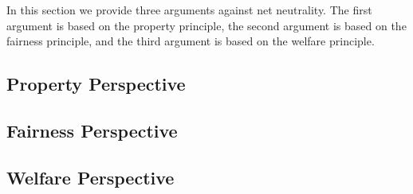 
In this section we provide three arguments against net neutrality. The first argument is based on the property principle, the second argument is based on the fairness principle, and the third argument is based on the welfare principle.

\subsection{Property Perspective}
\label{sec:arguments_property}


\subsection{Fairness Perspective}
\label{sec:arguments_fairness}


\subsection{Welfare Perspective}
\label{sec:arguments_welfare}
